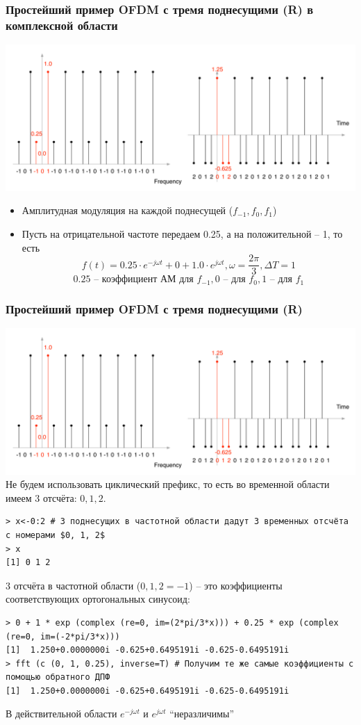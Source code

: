 \documentclass[utf8]{beamer}
\begin{document}
\begin{frame}
\frametitle{Простейший пример OFDM с тремя поднесущими (R) в
комплексной области}
\includegraphics[width=\textwidth]{pic/fft-example.pdf}
\begin{itemize}
  \item Амплитудная модуляция на каждой поднесущей ($f_{-1}, f_0, f_1$)
  \item Пусть на отрицательной частоте передаем 0.25, а на положительной -- 1, то есть 
  $$
  f(t) = 0.25 \cdot e^{-j\omega t} + 0 + 1.0\cdot e^{j\omega t} , \omega = \frac{2\pi}{3}, \Delta T = 1
  $$
  $$
  0.25 \textrm{ -- коэффициент АМ для } f_{-1}, 0\textrm{ -- для } f_0, 1\textrm{ -- для }  f_1
  $$
\end{itemize}
\end{frame}
\begin{frame}[fragile]
\frametitle{Простейший пример OFDM с тремя поднесущими (R)}

\includegraphics[width=\textwidth]{pic/fft-example.pdf}
\newline
\tiny
Не будем использовать циклический префикс, то есть во временной области имеем 3 отсчёта: $0, 1, 2$.
\begin{verbatim}
> x<-0:2 # 3 поднесущих в частотной области дадут 3 временных отсчёта с номерами $0, 1, 2$
> x
[1] 0 1 2
\end{verbatim}
3 отсчёта в частотной области ($0, 1, 2=-1$) -- это коэффициенты соответствующих ортогональных синусоид:
\begin{verbatim}
> 0 + 1 * exp (complex (re=0, im=(2*pi/3*x))) + 0.25 * exp (complex (re=0, im=(-2*pi/3*x)))
[1]  1.250+0.0000000i -0.625+0.6495191i -0.625-0.6495191i
> fft (c (0, 1, 0.25), inverse=T) # Получим те же самые коэффициенты с помощью обратного ДПФ
[1]  1.250+0.0000000i -0.625+0.6495191i -0.625-0.6495191i
\end{verbatim}
В действительной области $e^{-j\omega t}$ и $e^{j\omega t} $ ``неразличимы''
\end{frame}
\end{document}

